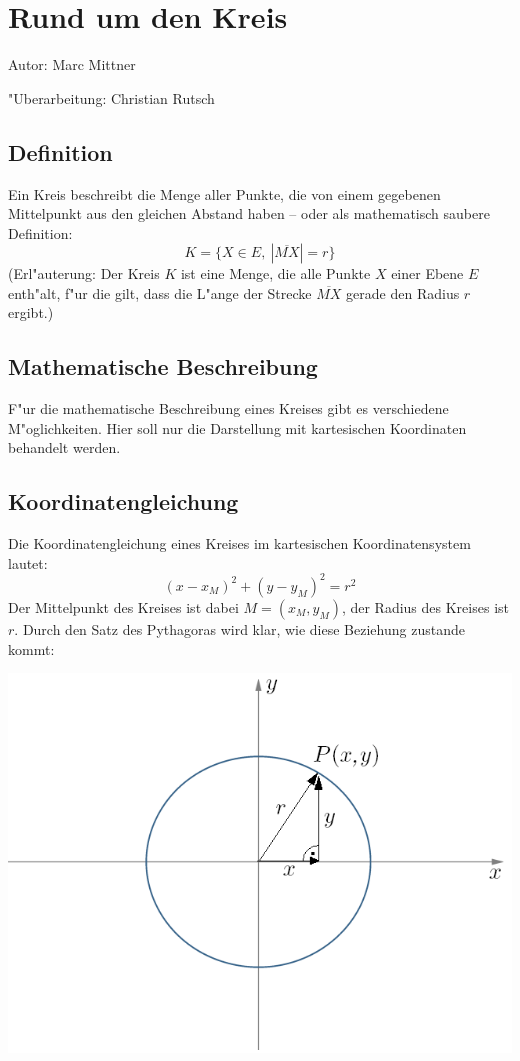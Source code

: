 \section{Rund um den Kreis}
Autor: Marc Mittner

\noindent "Uberarbeitung: Christian Rutsch

\subsection{Definition}
Ein Kreis beschreibt die Menge aller Punkte, die von einem gegebenen Mittelpunkt aus den gleichen Abstand haben -- oder als mathematisch saubere Definition:
\[ K = \lbrace X \in E ,\  |\overline {MX}| = r \rbrace \]
(Erl"auterung: Der Kreis $K$ ist eine Menge, die alle Punkte $X$ einer Ebene $E$ enth"alt, f"ur die gilt, dass die L"ange der Strecke $\overline{MX}$ gerade den Radius $r$ ergibt.)

\subsection{Mathematische Beschreibung}
F"ur die mathematische Beschreibung eines Kreises gibt es verschiedene M"oglichkeiten. Hier soll nur die Darstellung mit kartesischen Koordinaten behandelt werden.

\subsection{Koordinatengleichung}
Die Koordinatengleichung eines Kreises im kartesischen Koordinatensystem lautet:
\[ (x - x_M)^2 + (y - y_M)^2 = r^2 \]
Der Mittelpunkt des Kreises ist dabei $M = (x_M , y_M)$, der Radius des Kreises ist $r$.
Durch den Satz des Pythagoras wird klar, wie diese Beziehung zustande kommt:

\begin{center}
\includegraphics[scale=0.25]{img/kreis/kreis.png}
\end{center}

